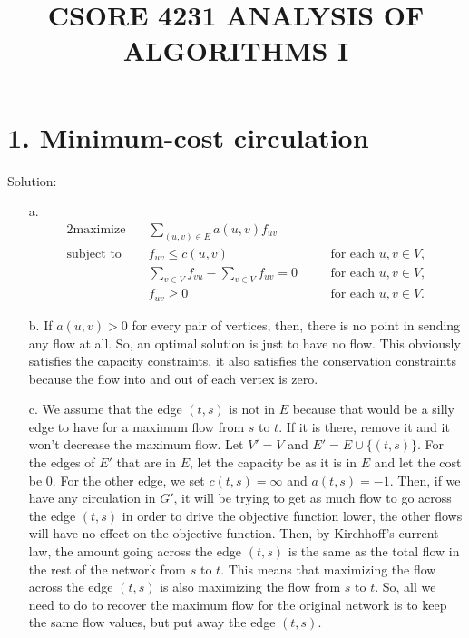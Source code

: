 \documentclass{article}
\title{CSORE 4231 ANALYSIS OF ALGORITHMS I \exerciseset}
\author{\studentname  \qquad \suid}
\begin{document}
\maketitle

\section*{1. Minimum-cost circulation}
Solution:
\begin{enumerate}
    \item[a.] 
    \begin{alignat*}{2}
    \text{maximize}   \quad & \sum_{(u,v) \in E} a(u, v)f_{uv} \\
    \text{subject to} \quad & f_{uv} \leq c(u, v) &\quad& \text{for each } u, v \in V,\\
                        & \sum_{v \in V} f_{vu} - \sum_{v \in V} f_{uv} = 0 && \text{for each } u, v \in V,\\
                        & f_{uv} \geq 0 && \text{for each } u, v \in V.
    \end{alignat*}
    \item[b.] If \(a(u,v) > 0\) for every pair of vertices, then, there is no point in sending any flow at all. So, an optimal solution is just to have no flow. This obviously satisfies the capacity constraints, it also satisfies the conservation constraints because the flow into and out of each vertex is zero.
    \item[c.] We assume that the edge \((t, s)\) is not in \(E\) because that would be a silly edge to have for a maximum flow from \(s\) to \(t\). If it is there, remove it and it won't decrease the maximum flow. Let \(V' = V\) and \(E' = E \cup \{(t, s)\}\). For the edges of \(E'\) that are in \(E\), let the capacity be as it is in \(E\) and let the cost be 0. For the other edge, we set \(c(t, s) = \infty\) and \(a(t, s) = -1\). Then, if we have any circulation in \(G'\), it will be trying to get as much flow to go across the edge \((t, s)\) in order to drive the objective function lower, the other flows will have no effect on the objective function. Then, by Kirchhoff’s current law, the amount going across the edge \((t, s)\) is the same as the total flow in the rest of the network from \(s\) to \(t\). This means that maximizing the flow across the edge \((t, s)\) is also maximizing the flow from \(s\) to \(t\). So, all we need to do to recover the maximum flow for the original network is to keep the same flow values, but put away the edge \((t, s)\).


\end{enumerate}
\end{document}
